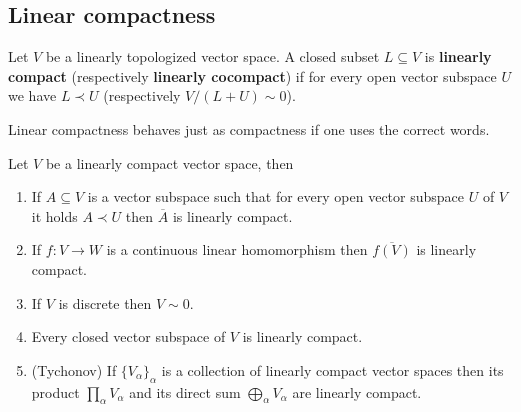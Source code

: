 \subsection*{Linear compactness}
\begin{definition}\label{def:linear_compactness}
	Let $V$ be a linearly topologized vector space. A closed subset $L \subseteq V$ is \textbf{linearly compact} (respectively \textbf{linearly cocompact}) if for every open vector subspace $U$ we have $L \prec U$ (respectively $V/(L+U) \sim 0$). 
\end{definition}
Linear compactness behaves just as compactness if one uses the correct words.
\begin{proposition}\label{prop:linear_compactness_properties}
	Let $V$ be a linearly compact vector space, then
	\begin{enumerate}[label = (\alph*)]
		\item If $A \subseteq V$ is a vector subspace such that for every open vector subspace $U$ of $V$ it holds $A \prec U$ then $\overline{A}$ is linearly compact.
		\item If $f\colon V \to W$ is a continuous linear homomorphism then $\overline{f(V)}$ is linearly compact.
		\item If $V$ is discrete then $V \sim 0$.
		\item Every closed vector subspace of $V$ is linearly compact.
		\item (Tychonov) If $\{V_{\alpha}\}_{\alpha}$ is a collection of linearly compact vector spaces then its product $\prod_{\alpha} V_{\alpha}$ and its direct sum $\bigoplus_{\alpha}V_{\alpha}$ are linearly compact.
	\end{enumerate}
\end{proposition}
